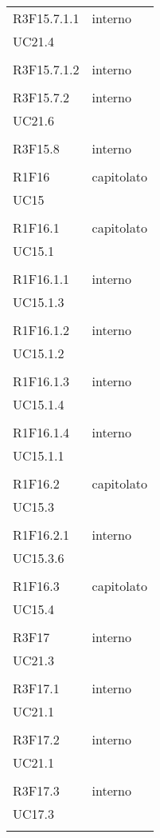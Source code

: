 \begin{longtable}{ >{\centering}p{}
		>{\centering}p{}}
	R3F15.7.1.1 & interno\\UC21.4\\\tabularnewline
	
	R3F15.7.1.2 & interno\\\tabularnewline
	
	R3F15.7.2 & interno\\UC21.6\\\tabularnewline
	
	R3F15.8 & interno\\\tabularnewline
	
	R1F16 & capitolato\\UC15\\\tabularnewline
	
	R1F16.1 & capitolato\\UC15.1\\\tabularnewline
	
	R1F16.1.1 & interno\\UC15.1.3\\\tabularnewline
	
	R1F16.1.2 & interno\\UC15.1.2\\\tabularnewline
	
	R1F16.1.3 & interno\\UC15.1.4\\\tabularnewline
	
	R1F16.1.4 & interno\\UC15.1.1\\\tabularnewline
	
	R1F16.2 & capitolato\\UC15.3\\\tabularnewline
	
	R1F16.2.1 & interno\\UC15.3.6\\\tabularnewline
	
	R1F16.3 & capitolato\\UC15.4\\\tabularnewline
	
	R3F17 & interno\\UC21.3\\\tabularnewline
	
	R3F17.1 & interno\\UC21.1\\\tabularnewline
	
	R3F17.2 & interno\\UC21.1\\\tabularnewline
	
	R3F17.3 & interno\\UC17.3\\\tabularnewline
	

\end{longtable}
